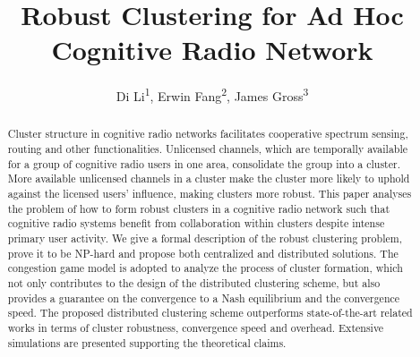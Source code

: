 \documentclass[times]{ettauth}
\theoremstyle{mytheoremstyle}
\theoremstyle{mytheoremstyle}
\theoremstyle{mytheoremstyle}
\begin{document}


\title{Robust Clustering for Ad Hoc Cognitive Radio Network}
\author{Di Li\textsuperscript{1}\corrauth, Erwin Fang\textsuperscript{2}, James Gross\textsuperscript{3}}
\address{RWTH Aachen University\textsuperscript{1}, Swisscom (Schweiz) AG\textsuperscript{2}, KTH Royal Institute of Technology\textsuperscript{3} }




\begin{abstract}
Cluster structure in cognitive radio networks facilitates cooperative spectrum sensing, routing and other functionalities.
Unlicensed channels, which are temporally available for a group of cognitive radio users in one area, consolidate the group into a cluster.
More available unlicensed channels in a cluster make the cluster more likely to uphold against the licensed users' influence, making clusters more robust.
This paper analyses the problem of how to form robust clusters in a cognitive radio network such that cognitive radio systems benefit from collaboration within clusters despite intense primary user activity.
We give a formal description of the robust clustering problem, prove it to be NP-hard and propose both centralized and distributed solutions.
The congestion game model is adopted to analyze the process of cluster formation, which not only contributes to the design of the distributed clustering scheme, but also provides a guarantee on the convergence to a Nash equilibrium and the convergence speed.
The proposed distributed clustering scheme outperforms state-of-the-art related works in terms of cluster robustness, convergence speed and overhead.
Extensive simulations are presented supporting the theoretical claims.
\end{abstract}
\end{document}
